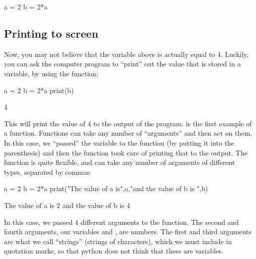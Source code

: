 \begin{python}[caption=Assignment operator] 
a = 2 
b = 2*a
\end{python}

\subsection{Printing to screen}
Now, you may not believe that the variable  above is actually equal to 4. Luckily, you can ask the computer program to ``print'' out the value that is stored in a variable, by using the  function:
\begin{python}[caption=Printing]  
a = 2 
b = 2*a
print(b)
\end{python}
\begin{poutput}
4
\end{poutput}
This will print the value of 4 to the output of the program.  is the first example of a function. Functions can take any number of ``arguments'' and then act on them. In this case, we ``passed'' the variable  to the function  (by putting it into the parenthesis) and then the function took care of printing that to the output. The  function is quite flexible, and can take any number of arguments of different types, separated by commas:
\begin{python}[caption=Printing multiple items] 
a = 2 
b = 2*a
print("The value of a is",a,"and the value of b is ",b)
\end{python}
\begin{poutput}
The value of a is 2 and the value of b is  4
\end{poutput}
In this case, we passed 4 different arguments to the  function. The second and fourth arguments, our variables  and , are numbers. The first and third arguments are what we call ``strings'' (strings of characters), which we must include in quotation marks, so that python does not think that these are variables.

